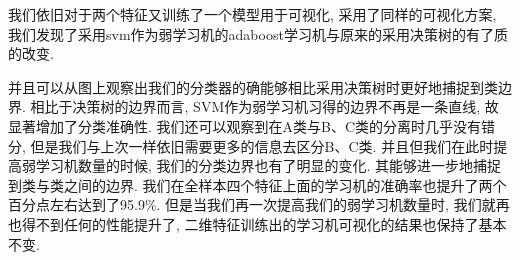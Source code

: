 \documentclass[lang=cn,11pt]{elegantpaper}
\begin{document}
我们依旧对于两个特征又训练了一个模型用于可视化, 采用了同样的可视化方案, 我们发现了采用svm作为弱学习机的adaboost学习机与原来的采用决策树的有了质的改变.




并且可以从图上观察出我们的分类器的确能够相比采用决策树时更好地捕捉到类边界. 相比于决策树的边界而言, SVM作为弱学习机习得的边界不再是一条直线, 故显著增加了分类准确性. 我们还可以观察到在A类与B、C类的分离时几乎没有错分, 但是我们与上次一样依旧需要更多的信息去区分B、C类. 并且但我们在此时提高弱学习机数量的时候, 我们的分类边界也有了明显的变化. 其能够进一步地捕捉到类与类之间的边界. 我们在全样本四个特征上面的学习机的准确率也提升了两个百分点左右达到了95.9\%. 但是当我们再一次提高我们的弱学习机数量时, 我们就再也得不到任何的性能提升了, 二维特征训练出的学习机可视化的结果也保持了基本不变.





\newpage
\nocite{*}



\end{document}
